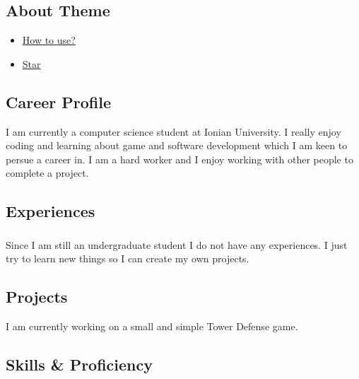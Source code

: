 \documentclass[english,]{article}
\providecommand{\tightlist}{%
  \setlength{\itemsep}{0pt}\setlength{\parskip}{0pt}}
\begin{document}
\hypertarget{about-theme}{%
\subsection{About Theme}\label{about-theme}}

\begin{itemize}
\tightlist
\item
  \href{https://www.youtube.com/watch?v=Jnmj1dXDbNk}{How to use?}
\item
  \href{https://github.com/sharu725/online-cv}{Star}
\end{itemize}

\hypertarget{career-profile}{%
\subsection{\texorpdfstring{{ \emph{} \emph{} } Career
Profile}{    Career Profile}}\label{career-profile}}

I am currently a computer science student at Ionian University. I really
enjoy coding and learning about game and software development which I am
keen to persue a career in. I am a hard worker and I enjoy working with
other people to complete a project.

\hypertarget{experiences}{%
\subsection{\texorpdfstring{{ \emph{} \emph{} }
Experiences}{    Experiences}}\label{experiences}}

\hypertarget{section}{%
\subsubsection{}\label{section}}

Since I am still an undergraduate student I do not have any experiences.
I just try to learn new things so I can create my own projects.

\hypertarget{projects}{%
\subsection{\texorpdfstring{{ \emph{} \emph{} }
Projects}{    Projects}}\label{projects}}

I am currently working on a small and simple Tower Defense game.

\hypertarget{skills-proficiency}{%
\subsection{\texorpdfstring{{ \emph{} \emph{} } Skills \&
Proficiency}{    Skills \& Proficiency}}\label{skills-proficiency}}
\end{document}
